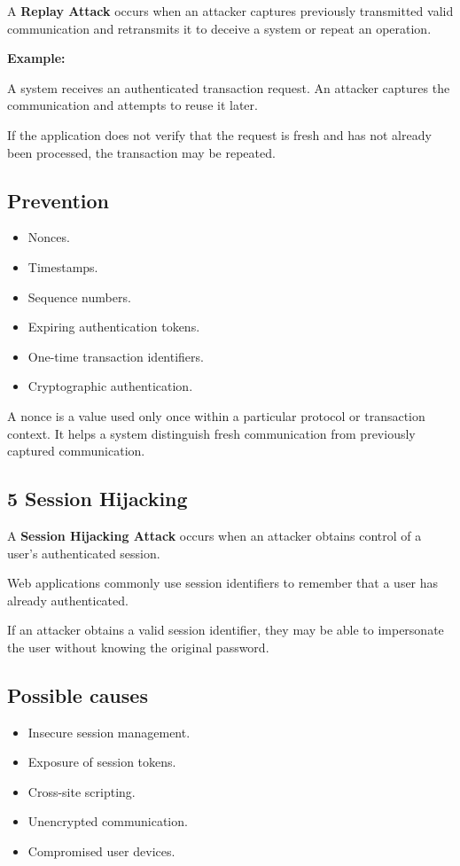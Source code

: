 A \textbf{Replay Attack} occurs when an attacker captures previously transmitted valid communication and retransmits it to deceive a system or repeat an operation.

\textbf{Example:}

A system receives an authenticated transaction request. An attacker captures the communication and attempts to reuse it later.

If the application does not verify that the request is fresh and has not already been processed, the transaction may be repeated.

\subsection{Prevention}

\begin{itemize}
\item Nonces.
\item Timestamps.
\item Sequence numbers.
\item Expiring authentication tokens.
\item One-time transaction identifiers.
\item Cryptographic authentication.
\end{itemize}

A nonce is a value used only once within a particular protocol or transaction context. It helps a system distinguish fresh communication from previously captured communication.

\subsection{5 Session Hijacking}

A \textbf{Session Hijacking Attack} occurs when an attacker obtains control of a user's authenticated session.

Web applications commonly use session identifiers to remember that a user has already authenticated.

If an attacker obtains a valid session identifier, they may be able to impersonate the user without knowing the original password.

\subsection{Possible causes}

\begin{itemize}
\item Insecure session management.
\item Exposure of session tokens.
\item Cross-site scripting.
\item Unencrypted communication.
\item Compromised user devices.
\end{itemize}

